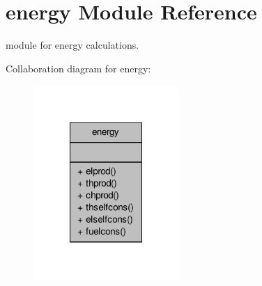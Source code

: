 \hypertarget{classenergy}{\section{energy Module Reference}
\label{classenergy}
}


module for energy calculations.  




Collaboration diagram for energy\-:\nopagebreak
\begin{figure}[H]
\begin{center}
\leavevmode
\includegraphics[width=156pt]{classenergy__coll__graph}
\end{center}
\end{figure}
